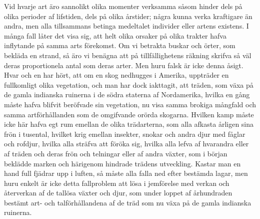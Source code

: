 Vid hvarje art äro sannolikt olika momenter verksamma såsom hinder dels på olika perioder af lifstiden, dels på olika årstider; några kunna verka kraftigare än andra, men alla tillsammans betinga medeltalet individer eller artens existens. I många fall låter det visa sig, att helt olika orsaker på olika trakter hafva inflytande på samma arts förekomst. Om vi betrakta buskar och örter, som bekläda en strand, så äro vi benägna att på tillfällighetens räkning skrifva så väl deras proportionela antal som deras arter. Men huru falsk är icke denna åsigt. Hvar och en har hört, att om en skog nedhugges i Amerika, uppträder en fullkomligt olika vegetation, och man har dock iakttagit, att träden, som växa på de gamla indianska ruinerna i de södra staterna af Nordamerika, hvilka en gång måste hafva blifvit beröfvade sin vegetation, nu visa samma brokiga mångfald och samma artförhållanden som de omgifvande orörda skogarna. Hvilken kamp måste icke här hafva egt rum emellan de olika trädarterna, som alla afkasta årligen sina frön i tusental, hvilket krig emellan insekter, snokar och andra djur med fåglar och rofdjur, hvilka alla sträfva att föröka sig, hvilka alla lefva af hvarandra eller af träden och deras frön och telningar eller af andra växter, som i början beklädde marken och härigenom hindrade trädens utveckling. Kastar man en hand full fjädrar upp i luften, så måste alla falla ned efter bestämda lagar, men huru enkelt är icke detta fallproblem att lösa i jemförelse med verkan och återverkan af de tallösa växter och djur, som under loppet af århundraden bestämt art- och talförhållandena af de träd som nu växa på de gamla indianska ruinerna.

